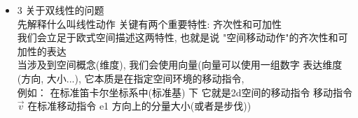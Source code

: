 \documentclass[12pt]{article}
\begin{document}
\begin{flushleft}
\begin{itemize}
              \vspace{0.3em}
              \textbf{2.1.2:点积的结果为什么是标量 C(一维) ?}

              我们已经在 1 - 1.2 中解释了为什么是标量, 表示相似程度和 共同作用的 "趋势", 标量是最简洁的表达方式 没有之一. \\
              但我们会观察到 一种很明显的现象: 降维 \\
              向量是多维的 [1,2] 是 2d, [1,2,3] 是 3d, 但不管 v, u 是几维, C 都是一个标量  \\
              也就是内积 可以处理两个复杂维度的向量, 降维到1 维 关系它们的相似度, 剥离了它们的维度复杂度, 但这种降维并不是无损的, 而是有损的 把"两个向量的对齐程度"提炼成一个数

              \vspace{0.3em}
              \textbf{2.2 内积与数学模型的关系}

              通过 2.1 我们得到了下列关键 几何-代数映射模型(左边代数, 右边代数): \\
              长度(模):$ |v| = \sqrt{x_{1}^{2} + y_{1}^{2}} $  \\
              角度$(\theta \;)$: $\cos\theta = \frac{v\cdot u}{|v||u|}$  \\
              正交(几何) $\rightarrow$ 内积为零(代数): $\vec{u} \perp \vec{v} \iff \vec{u} \cdot \vec{v} = 0$
              距离: d = $\sqrt{(x_{1} - x_{2})^{2} + (y_{1}- y_{2})^{2} }$ \\

              当向量空间拥有内积提供的代数模型的几何空间 就是欧几里得空间  \\
              内积作为一种“测量工具”，其测量过程是线性的、没有发生非线性扭曲 \\
              \vspace{0.5em}
        \item 3 关于双线性的问题 \\

              先解释什么叫线性动作 关键有两个重要特性: 齐次性和可加性 \\
              我们会立足于欧式空间描述这两特性, 也就是说 "空间移动动作"的齐次性和可加性的表达 \\
              当涉及到空间概念(维度), 我们会使用向量(向量可以使用一组数字 表达维度(方向, 大小...), 它本质是在指定空间环境的移动指令, \\
              例如： 在标准笛卡尔坐标系中(标准基) 下 它就是2d空间的移动指令  移动指令 $\vec{v}$ 在标准移动指令 e1 方向上的分量大小(或者是步伐)) \\


\end{itemize}
\end{flushleft}
\end{document}
